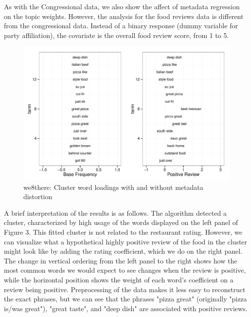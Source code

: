 \documentclass[12pt]{article}
\begin{document}
As with the Congressional data, we also show the affect of metadata regression on the topic weights. However, the analysis for the food reviews data is different from the congressional data. Instead of a binary response (dummy variable for party affiliation), the covariate is the overall food review score, from 1 to 5.

\begin{figure}[!htpb]
  \centering
\caption[Loadings]{we8there: Cluster word loadings with and without  metadata distortion}
  \includegraphics[width=6.2in]{Images/we8there_distortion.pdf}
\end{figure}

A brief interpretation of the results is as follows. The algorithm detected a cluster, characterized by high usage of the words displayed on the left panel of Figure 3. This fitted cluster is not related to the restaurant rating. However, we can visualize what a hypothetical highly positive review of the food in the cluster might look like by adding the rating coefficient, which we do on the right panel. The change in vertical ordering from the left panel to the right shows how the most common words we would expect to see changes when the review is positive, while the horizontal position shows the weight of each word's coefficient on a review being positive. Preprocessing of the data makes it less easy to reconstruct the exact phrases, but we can see that the phrases "pizza great" (originally "pizza is/was great"), "great taste", and "deep dish" are associated with positive reviews. 
\end{document}

